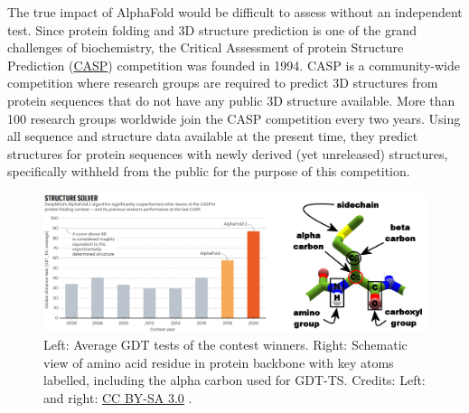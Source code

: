 The true impact of AlphaFold would be difficult to assess without an independent test.
Since protein folding and 3D structure prediction is one of the grand challenges of biochemistry, the Critical Assessment of protein Structure Prediction (\href{https://predictioncenter.org/}{CASP}) competition was founded in 1994.
CASP is a community-wide competition where research groups are required to predict 3D structures from protein sequences that do not have any public 3D structure available.
More than 100 research groups worldwide join the CASP competition every two years.
Using all sequence and structure data available at the present time, they predict structures for protein sequences with newly derived (yet unreleased) structures, specifically withheld from the public for the purpose of this competition.

\begin{figure}[!htbp]
\centering
\includegraphics[width=0.7\linewidth]{files/casp-d706499c57fea3f27ea62f8271398b06.png}
\caption[]{Left: Average GDT tests of the contest winners.
Right: Schematic view of amino acid residue in protein backbone with key atoms labelled, including the alpha carbon used for GDT-TS.
Credits: Left: \cite{GDT_2020} and right: \href{https://creativecommons.org/licenses/by-sa/3.0/}{CC BY-SA 3.0} \cite{alpha_carbon_2018}.}
\label{casp}
\end{figure}

